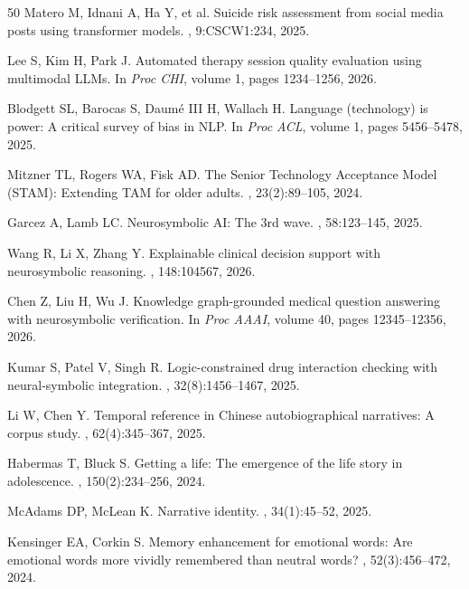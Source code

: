 \documentclass{article}
\begin{document}
\begin{thebibliography}{50}
Matero M, Idnani A, Ha Y, et al.
\newblock Suicide risk assessment from social media posts using transformer models.
, 9:CSCW1:234, 2025.

Lee S, Kim H, Park J.
\newblock Automated therapy session quality evaluation using multimodal LLMs.
\newblock In {\em Proc CHI}, volume 1, pages 1234--1256, 2026.

Blodgett SL, Barocas S, Daumé III H, Wallach H.
\newblock Language (technology) is power: A critical survey of bias in NLP.
\newblock In {\em Proc ACL}, volume 1, pages 5456--5478, 2025.

Mitzner TL, Rogers WA, Fisk AD.
\newblock The Senior Technology Acceptance Model (STAM): Extending TAM for older adults.
, 23(2):89--105, 2024.

Garcez A, Lamb LC.
\newblock Neurosymbolic AI: The 3rd wave.
, 58:123--145, 2025.

Wang R, Li X, Zhang Y.
\newblock Explainable clinical decision support with neurosymbolic reasoning.
, 148:104567, 2026.

Chen Z, Liu H, Wu J.
\newblock Knowledge graph-grounded medical question answering with neurosymbolic verification.
\newblock In {\em Proc AAAI}, volume 40, pages 12345--12356, 2026.

Kumar S, Patel V, Singh R.
\newblock Logic-constrained drug interaction checking with neural-symbolic integration.
, 32(8):1456--1467, 2025.

Li W, Chen Y.
\newblock Temporal reference in Chinese autobiographical narratives: A corpus study.
, 62(4):345--367, 2025.

Habermas T, Bluck S.
\newblock Getting a life: The emergence of the life story in adolescence.
, 150(2):234--256, 2024.

McAdams DP, McLean K.
\newblock Narrative identity.
, 34(1):45--52, 2025.

Kensinger EA, Corkin S.
\newblock Memory enhancement for emotional words: Are emotional words more vividly remembered than neutral words?
, 52(3):456--472, 2024.


\end{thebibliography}
\end{document}
